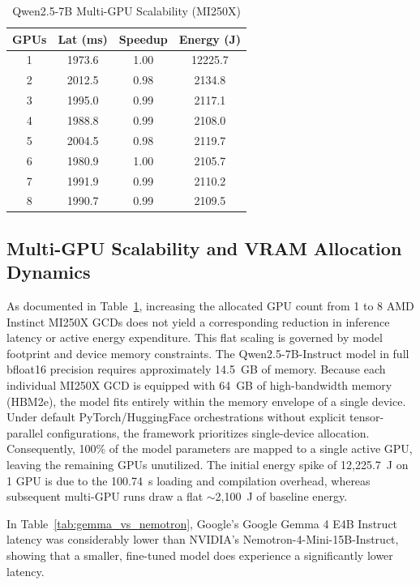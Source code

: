 \documentclass[11pt]{article}
\begin{document}
\begin{table}[H]
\centering
\small
\caption{Qwen2.5-7B Multi-GPU Scalability (MI250X)}
\label{tab:gpu_scalability}
\begin{tabular}{cccc}
\toprule
GPUs & Lat (ms) & Speedup & Energy (J) \\ \midrule
1 & 1973.6 & 1.00 & 12225.7 \\
2 & 2012.5 & 0.98 & 2134.8 \\
3 & 1995.0 & 0.99 & 2117.1 \\
4 & 1988.8 & 0.99 & 2108.0 \\
5 & 2004.5 & 0.98 & 2119.7 \\
6 & 1980.9 & 1.00 & 2105.7 \\
7 & 1991.9 & 0.99 & 2110.2 \\
8 & 1990.7 & 0.99 & 2109.5 \\ \bottomrule
\end{tabular}
\end{table}

\subsection{Multi-GPU Scalability and VRAM Allocation Dynamics}
As documented in Table~\ref{tab:gpu_scalability}, increasing the allocated GPU count from 1 to 8 AMD Instinct MI250X GCDs does not yield a corresponding reduction in inference latency or active energy expenditure. This flat scaling is governed by model footprint and device memory constraints. The Qwen2.5-7B-Instruct model in full bfloat16 precision requires approximately 14.5~GB of memory. Because each individual MI250X GCD is equipped with 64~GB of high-bandwidth memory (HBM2e), the model fits entirely within the memory envelope of a single device. Under default PyTorch/HuggingFace orchestrations without explicit tensor-parallel configurations, the framework prioritizes single-device allocation. Consequently, 100\% of the model parameters are mapped to a single active GPU, leaving the remaining GPUs unutilized. The initial energy spike of 12,225.7~J on 1 GPU is due to the 100.74~s loading and compilation overhead, whereas subsequent multi-GPU runs draw a flat $\sim$2,100~J of baseline energy.

In Table~\ref{tab:gemma_vs_nemotron}, Google's Google Gemma 4 E4B Instruct latency was considerably lower than NVIDIA's Nemotron-4-Mini-15B-Instruct, showing that a smaller, fine-tuned model does experience a significantly lower latency.
\end{document}
